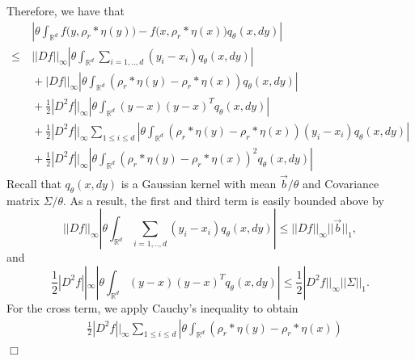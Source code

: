 \documentclass[12pt]{article}
\newenvironment {proof}{{\noindent\bf Proof }}{\hfill $\Box$ \medskip}
\newcommand{\meanq}{\vec b}    %
\newcommand{\covq}{\Sigma}     %
\begin{document}
\begin{proof}
Therefore, we have that 
\begin{equation}
\begin{aligned}
&~\left| 
        \theta \int_{\mathbb{R}^d}
                f\big(y,\rho_{r}*\eta(y)\big)-f\big(x,\rho_{r}*\eta(x)\big)
                q_{\theta}(x,dy)
\right|\\
\leq &~ ||Df||_{\infty} \left|
                        \theta \int_{\mathbb{R}^d} \sum_{i=1,..,d}(y_i-x_i) q_{\theta}(x,dy)
                        \right|\\ 
        &~ + |Df||_{\infty} 
            \left| \theta \int_{\mathbb{R}^d}
               \left(\rho_{r}*\eta(y)-\rho_{r}*\eta(x)\right)
            q_{\theta}(x,dy) \right| \\
        &~ + \frac{1}{2}|D^2f||_{\infty}\left|
                        \theta \int_{\mathbb{R}^d} (y-x)(y-x)^{T} q_{\theta}(x,dy)
                        \right|\\
        &~ + \frac{1}{2}|D^2f||_{\infty}    
                \sum_{1 \leq i \leq d}\left|
                        \theta \int_{\mathbb{R}^d}
                        \left(\rho_{r}*\eta(y)-\rho_{r}*\eta(x)\right)
                  (y_i-x_i)
                        q_{\theta}(x,dy)
                        \right|
                    \\
        &~ + \frac{1}{2}|D^2f||_{\infty} \left|
            \theta \int_{\mathbb{R}^d}
            \left(\rho_{r}*\eta(y)-\rho_{r}*\eta(x)
            \right)^2
            q_\theta(x,dy) \right|
\end{aligned}    
\end{equation}
Recall that $q_{\theta}(x,dy)$ is a Gaussian kernel
with mean $\meanq/\theta$
and Covariance matrix $\covq / \theta$.
As a result, the first and third term
is easily bounded above by 
$$||Df||_{\infty} \left|
                        \theta \int_{\mathbb{R}^d} \sum_{i=1,..,d}(y_i-x_i) q_{\theta}(x,dy)
                        \right|
                        \leq  ||Df||_{\infty}||\meanq||_{1},$$
and 
$$ \frac{1}{2}|D^2f||_{\infty}\left|
                        \theta \int_{\mathbb{R}^d} (y-x)(y-x)^{T} q_{\theta}(x,dy)
                        \right| \leq \frac{1}{2}|D^2f||_{\infty} ||\covq||_{1}.$$
For the cross term, we apply Cauchy's inequality to obtain
\begin{equation}
\begin{aligned}
&\frac{1}{2}|D^2f||_{\infty}\sum_{1 \leq i \leq d}    
                \left|
                        \theta \int_{\mathbb{R}^d}
                        \left(\rho_{r}*\eta(y)-\rho_{r}*\eta(x)\right)

\end{aligned}
\end{equation}
\end{proof}
\end{document}
